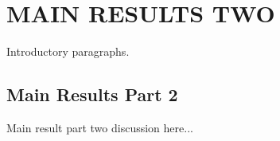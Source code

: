 \chapter{MAIN RESULTS TWO}

Introductory paragraphs.

\section{Main Results Part 2}

Main result part two discussion here...